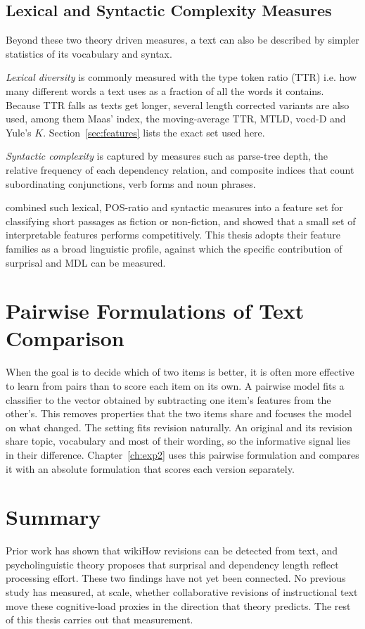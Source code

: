 \documentclass[12pt,a4paper,oneside]{report}
\begin{document}
\subsection{Lexical and Syntactic Complexity Measures}
Beyond these two theory driven measures, a text can also be described by simpler statistics of its vocabulary and syntax.

\emph{Lexical diversity} is commonly measured with the type token ratio (TTR) i.e. how many different words a text uses as a fraction of all the words it contains. Because TTR falls as texts get longer, several length corrected variants are also used, among them Maas' index, the moving-average TTR, MTLD, vocd-D and Yule's $K$. Section~\ref{sec:features} lists the exact set used here.

\emph{Syntactic complexity} is captured by measures such as parse-tree depth, the relative frequency of each dependency relation, and composite indices that count subordinating conjunctions, verb forms and noun phrases.

\citet{kazmi2022} combined such lexical, POS-ratio and syntactic measures into a feature set for classifying short passages as fiction or non-fiction, and showed that a small set of interpretable features performs competitively. This thesis adopts their feature families as a broad linguistic profile, against which the specific contribution of surprisal and MDL can be measured.

\section{Pairwise Formulations of Text Comparison}
When the goal is to decide which of two items is better, it is often more effective to learn from pairs than to score each item on its own. A pairwise model fits a classifier to the vector obtained by subtracting one item's features from the other's. This removes properties that the two items share and focuses the model on what changed. The setting fits revision naturally. An original and its revision share topic, vocabulary and most of their wording, so the informative signal lies in their difference. Chapter~\ref{ch:exp2} uses this pairwise formulation and compares it with an absolute formulation that scores each version separately.

\section{Summary}
Prior work has shown that wikiHow revisions can be detected from text, and psycholinguistic theory proposes that surprisal and dependency length reflect processing effort. These two findings have not yet been connected. No previous study has measured, at scale, whether collaborative revisions of instructional text move these cognitive-load proxies in the direction that theory predicts. The rest of this thesis carries out that measurement.
\end{document}
